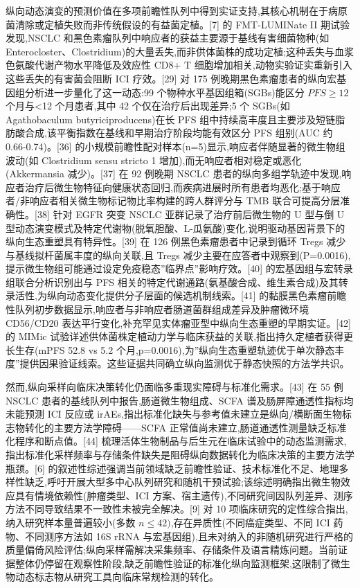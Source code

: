 纵向动态演变的预测价值在多项前瞻性队列中得到实证支持,其核心机制在于病原菌清除或定植失败而非传统假设的有益菌定植。{[}7{]} 的 FMT-LUMINate II 期试验发现,NSCLC 和黑色素瘤队列中响应者的获益主要源于基线有害细菌物种(如 Enterocloster、Clostridium)的大量丢失,而非供体菌株的成功定植;这种丢失与血浆色氨酸代谢产物水平降低及效应性 CD8+ T 细胞增加相关,动物实验证实重新引入这些丢失的有害菌会阻断 ICI 疗效。{[}29{]} 对 175 例晚期黑色素瘤患者的纵向宏基因组分析进一步量化了这一动态:99 个物种水平基因组箱(SGBs)能区分 \(PFS\geq12\) 个月与\textless12 个月患者,其中 42 个仅在治疗后出现差异;5 个 SGBs(如 Agathobaculum butyriciproducens)在长 PFS 组中持续高丰度且主要涉及短链脂肪酸合成,该平衡指数在基线和早期治疗阶段均能有效区分 PFS 组别(AUC 约 0.66-0.74)。{[}36{]} 的小规模前瞻性配对样本(n=5)显示,响应者伴随显著的微生物组波动(如 Clostridium sensu stricto 1 增加),而无响应者相对稳定或恶化(Akkermansia 减少)。{[}37{]} 在 92 例晚期 NSCLC 患者的纵向多组学轨迹中发现,响应者治疗后微生物特征向健康状态回归,而疾病进展时所有患者均恶化;基于响应者/非响应者相关微生物标记物比率构建的跨人群评分与 TMB 联合可提高分层准确性。{[}38{]} 针对 EGFR 突变 NSCLC 亚群记录了治疗前后微生物的 U 型与倒 U 型动态演变模式及特定代谢物(脱氧胆酸、L-瓜氨酸)变化,说明驱动基因背景下的纵向生态重塑具有特异性。{[}39{]} 在 126 例黑色素瘤患者中记录到循环 Tregs 减少与基线拟杆菌属丰度的纵向关联,且 Tregs 减少主要在应答者中观察到(P=0.0016),提示微生物组可能通过设定免疫稳态''临界点''影响疗效。{[}40{]} 的宏基因组与宏转录组联合分析识别出与 PFS 相关的特定代谢通路(氨基酸合成、维生素合成)及其转录活性,为纵向动态变化提供分子层面的候选机制线索。{[}41{]} 的黏膜黑色素瘤前瞻性队列初步数据显示,响应者与非响应者肠道菌群组成差异及肿瘤微环境 CD56/CD20 表达平行变化,补充罕见实体瘤亚型中纵向生态重塑的早期实证。{[}42{]} 的 MIMic 试验详述供体菌株定植动力学与临床获益的关联,指出持久定植者获得更长生存(mPFS 52.8 vs 5.2 个月,p=0.0016),为''纵向生态重塑轨迹优于单次静态丰度''提供因果验证线索。这些证据共同确立纵向监测优于静态快照的方法学共识。

然而,纵向采样向临床决策转化仍面临多重现实障碍与标准化需求。{[}43{]} 在 55 例 NSCLC 患者的基线队列中报告,肠道微生物组成、SCFA 谱及肠屏障通透性指标均未能预测 ICI 反应或 irAEs,指出标准化缺失与参考值未建立是纵向/横断面生物标志物转化的主要方法学障碍------SCFA 正常值尚未建立,肠道通透性测量缺乏标准化程序和断点值。{[}44{]} 梳理活体生物制品与后生元在临床试验中的动态监测需求,指出标准化采样频率与存储条件缺失是阻碍纵向数据转化为临床决策的主要方法学瓶颈。{[}6{]} 的叙述性综述强调当前领域缺乏前瞻性验证、技术标准化不足、地理多样性缺乏,呼吁开展大型多中心队列研究和随机干预试验;该综述明确指出微生物效应具有情境依赖性(肿瘤类型、ICI 方案、宿主遗传),不同研究间因队列差异、测序方法不同导致结果不一致性未被完全解决。{[}9{]} 对 10 项临床研究的定性综合指出,纳入研究样本量普遍较小(多数 \(n\leq42)\),存在异质性(不同癌症类型、不同 ICI 药物、不同测序方法如 16S rRNA 与宏基因组),且未对纳入的非随机研究进行严格的质量偏倚风险评估;纵向采样需解决采集频率、存储条件及语言精炼问题。当前证据整体仍停留在观察性阶段,缺乏前瞻性验证的标准化纵向监测框架,这限制了微生物动态标志物从研究工具向临床常规检测的转化。

